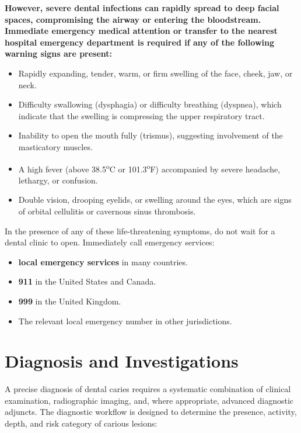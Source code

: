\textbf{However, severe dental infections can rapidly spread to deep facial spaces, compromising the airway or entering the bloodstream. Immediate emergency medical attention or transfer to the nearest hospital emergency department is required if any of the following warning signs are present:}
\begin{itemize}
    \item Rapidly expanding, tender, warm, or firm swelling of the face, cheek, jaw, or neck.
    \item Difficulty swallowing (dysphagia) or difficulty breathing (dyspnea), which indicate that the swelling is compressing the upper respiratory tract.
    \item Inability to open the mouth fully (trismus), suggesting involvement of the masticatory muscles.
    \item A high fever (above 38.5\textsuperscript{o}C or 101.3\textsuperscript{o}F) accompanied by severe headache, lethargy, or confusion.
    \item Double vision, drooping eyelids, or swelling around the eyes, which are signs of orbital cellulitis or cavernous sinus thrombosis.
\end{itemize}
In the presence of any of these life-threatening symptoms, do not wait for a dental clinic to open. Immediately call emergency services:
\begin{itemize}
    \item \textbf{local emergency services} in many countries.
    \item \textbf{911} in the United States and Canada.
    \item \textbf{999} in the United Kingdom.
    \item The relevant local emergency number in other jurisdictions.
\end{itemize}

\section*{Diagnosis and Investigations}
A precise diagnosis of dental caries requires a systematic combination of clinical examination, radiographic imaging, and, where appropriate, advanced diagnostic adjuncts. The diagnostic workflow is designed to determine the presence, activity, depth, and risk category of carious lesions:

